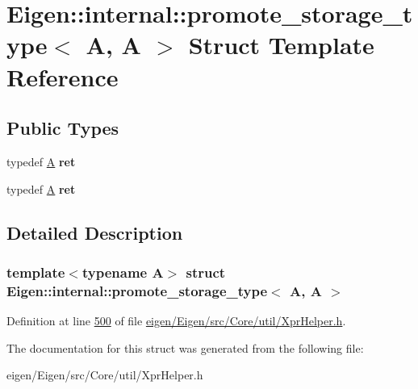 \hypertarget{struct_eigen_1_1internal_1_1promote__storage__type_3_01_a_00_01_a_01_4}{}\section{Eigen\+:\+:internal\+:\+:promote\+\_\+storage\+\_\+type$<$ A, A $>$ Struct Template Reference}
\label{struct_eigen_1_1internal_1_1promote__storage__type_3_01_a_00_01_a_01_4}
\subsection*{Public Types}
\begin{DoxyCompactItemize}
\item 
\mbox{\label{struct_eigen_1_1internal_1_1promote__storage__type_3_01_a_00_01_a_01_4_ab091df47078e366a85a513704ae9c415}} 
typedef \hyperlink{group___core___module_class_eigen_1_1_matrix}{A} {\bfseries ret}
\item 
\mbox{\label{struct_eigen_1_1internal_1_1promote__storage__type_3_01_a_00_01_a_01_4_ab091df47078e366a85a513704ae9c415}} 
typedef \hyperlink{group___core___module_class_eigen_1_1_matrix}{A} {\bfseries ret}
\end{DoxyCompactItemize}


\subsection{Detailed Description}
\subsubsection*{template$<$typename A$>$\newline
struct Eigen\+::internal\+::promote\+\_\+storage\+\_\+type$<$ A, A $>$}



Definition at line \hyperlink{eigen_2_eigen_2src_2_core_2util_2_xpr_helper_8h_source_l00500}{500} of file \hyperlink{eigen_2_eigen_2src_2_core_2util_2_xpr_helper_8h_source}{eigen/\+Eigen/src/\+Core/util/\+Xpr\+Helper.\+h}.



The documentation for this struct was generated from the following file\+:\begin{DoxyCompactItemize}
\item 
eigen/\+Eigen/src/\+Core/util/\+Xpr\+Helper.\+h\end{DoxyCompactItemize}
